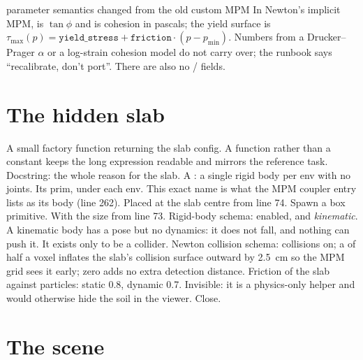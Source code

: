 \begin{warnbox}{parameter semantics changed from the old custom MPM}
In Newton's implicit MPM,  is $\tan\phi$ and
 is cohesion in pascals; the yield surface is
$\tau_{\max}(p) = \texttt{yield\_stress} + \texttt{friction}\cdot(p-p_{\min})$.
Numbers from a Drucker--Prager $\alpha$ or a log-strain cohesion model do not
carry over; the runbook says ``recalibrate, don't port''. There are also no
/ fields.
\end{warnbox}

\section{The hidden slab}


\begin{explain}
 A small factory function returning the slab config. A function
  rather than a constant keeps the long expression readable and mirrors the
  reference task.
 Docstring: the whole reason for the slab.
 A : a single rigid body per env with no joints.
 Its prim,  under each env. This exact name is what
  the MPM coupler entry lists as its body (line 262).
 Placed at the slab centre from line 74.
 Spawn a box primitive.
 With the size from line 73.
 Rigid-body schema: enabled, and \emph{kinematic}. A kinematic
  body has a pose but no dynamics: it does not fall, and nothing can push it.
  It exists only to be a collider.
 Newton collision schema: collisions on; a
   of half a voxel inflates the slab's collision
  surface outward by 2.5~cm so the MPM grid sees it early; 
  zero adds no extra detection distance.
 Friction of the slab against particles: static 0.8, dynamic
  0.7.
 Invisible: it is a physics-only helper and would otherwise hide the
  soil in the viewer.
 Close.
\end{explain}

\section{The scene}


